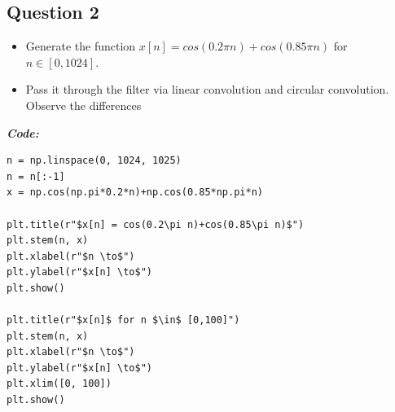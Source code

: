 \documentclass[11pt, a4paper]{article}
\begin{document}
\subsection{Question 2}
\begin{itemize}
  \item Generate the function $x[n] = cos(0.2\pi n)+cos(0.85\pi n) $ for $n \in [0,1024]$.
  \item Pass it through the filter via linear convolution and circular convolution. Observe the differences
\end{itemize}
\textit{\textbf{Code:}}

\begin{lstlisting}
n = np.linspace(0, 1024, 1025)
n = n[:-1]
x = np.cos(np.pi*0.2*n)+np.cos(0.85*np.pi*n)

plt.title(r"$x[n] = cos(0.2\pi n)+cos(0.85\pi n)$")
plt.stem(n, x)
plt.xlabel(r"$n \to$")
plt.ylabel(r"$x[n] \to$")
plt.show()

plt.title(r"$x[n]$ for n $\in$ [0,100]")
plt.stem(n, x)
plt.xlabel(r"$n \to$")
plt.ylabel(r"$x[n] \to$")
plt.xlim([0, 100])
plt.show()

\end{lstlisting}
\newpage
\end{document}
